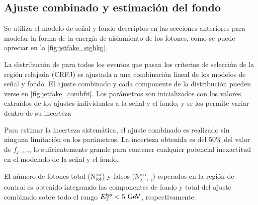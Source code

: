 
\subsection{Ajuste combinado y estimación del fondo} \label{sec:jet_fake_results}

Se utiliza el modelo de señal y fondo descriptos en las secciones anteriores para
modelar la forma de la energía de aislamiento de los fotones, como se puede
apreciar en la \cref{fig:jetfake_sigbkg}.

La distribución de {\etiso} para todos los eventos que pasan los criterios de
selección de la región relajada (CRFJ) es ajustada a una combinación lineal de
los modelos de señal y fondo. El ajuste combinado y cada componente de la
distribución pueden verse en \cref{fig:jetfake_combfit}. Los parámetros son
inicializados con los valores extraídos de los ajustes individuales a la señal y
el fondo, y se los permite variar dentro de su incerteza

Para estimar la incerteza sistemática, el ajuste combinado es realizado
sin ninguna limitación en los parámetros. La incerteza obtenida es del
50\% del valor de $f_{j\to\gamma}$, lo suficientemente grande para contener
cualquier potencial inexactitud en el modelado de la señal y el fondo.


El número de fotones total (N$_\text{tot}^\text{iso}$) y falsos
(N$_{j\to\gamma}^\text{iso}$) esperados en la región de control es obtenido
integrando las componentes de fondo y total del ajuste combinado sobre todo el
rango $\etiso<5\gev$, respectivamente:

